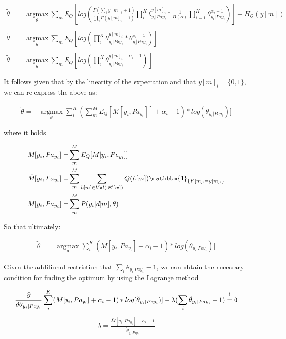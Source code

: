 \documentclass[11pt]{article}
\begin{document}
\begin{align} \label{eq:first-order-condition}
\tilde{\theta} =& \operatorname*{argmax}_{\theta} \sum_m E_Q[log(\frac{\Gamma(\sum_i y[m]_i + 1)}{\prod_i \Gamma(y[m]_i + 1)} \prod_i^K \theta_{y_i | Pa{y_i}}^{y[m]_i} * \frac{1}{B(\alpha)} \prod_{i=1}^K \theta_{y_i | Pa{y_i}}^{\alpha_i - 1})] + H_Q (y[m]) \\
\nonumber\\   
\tilde{\theta} =& \operatorname*{argmax}_{\theta} \sum_m E_Q[log(\prod_i^K \theta_{y_i | Pa{y_i}}^{y[m]_i} * \theta_{y_i | Pa{y_i}}^{\alpha_i - 1})]\\
\nonumber\\   
\tilde{\theta} =& \operatorname*{argmax}_{\theta} \sum_m E_Q[log(\prod_i^K \theta_{y_i | Pa{y_i}}^{y[m]_i + \alpha_i - 1})] 
\end{align}

It follows given that by the linearity of the expectation and that
\(y[m]_i = \{0,1\}\), we can re-express the above as:

\begin{align} \label{eq:solution1}
\tilde{\theta} =& \operatorname*{argmax}_{\theta} \sum_i^K (\sum_m^M E_Q[M[y_i, Pa_{y_i}]] + \alpha_i - 1) * log(\theta_{y_i | Pa{y_i}})] 
\end{align}

where it holds

\begin{align} \label{eq:expected_sufficient}
\bar{M}[y_i, Pa_{y_i}]  =& \sum_m^M E_Q[M[y_i, Pa_{y_i}]]\\
\bar{M}[y_i, Pa_{y_i}]  =& \sum_m^M \sum_{h[m] \in Val(\mathscr{H}[m])} Q(h[m]) \mathbbm{1}_{\{Y[m]_i = y[m]_i\}}\\
\bar{M}[y_i, Pa_{y_i}]  =& \sum_m^M P(y_i | d[m], \theta)
\end{align}

So that ultimately:

\begin{align} \label{eq:solution2}
\tilde{\theta} =& \operatorname*{argmax}_{\theta} \sum_i^K (\bar{M}[y_i, Pa_{y_i}] + \alpha_i - 1) * log(\theta_{y_i | Pa{y_i}})] 
\end{align}

Given the additional restriction that \(\sum_i \theta_{y_i |
   Pa{y_i}} = 1\), we can obtain the necessary condition for finding
the optimum by using the Lagrange method

\begin{align} \label{eq:first-order1}
\frac{\partial}{\partial \theta_{y_i | Pa{y_i}}} \sum_i^K (\bar{M}[y_i, Pa_{y_i}] + \alpha_i - 1) * log(\tilde{\theta}_{y_i | Pa{y_i}})] - \lambda (\sum_i \tilde{\theta}_{y_i | Pa{y_i}} - 1) \mathrel{\stackon[5pt]{$=$}{$\scriptstyle!$}} 0
\end{align}
\begin{align} \label{eq:first-order2}
\lambda = \frac{\bar{M}[y_i, Pa_{y_i}] + \alpha_i - 1}{\tilde{\theta}_{y_i | Pa{y_i}}}
\end{align}
\end{document}
